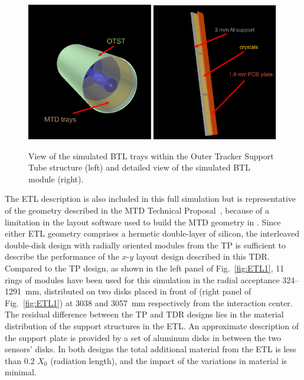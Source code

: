 \begin{figure}[hbtp]
\centering
\includegraphics[width=0.49\textwidth]{fig/performance/BTL1.pdf}
\includegraphics[width=0.49\textwidth]{fig/performance/BTL2.pdf}
\caption{View of the simulated BTL trays within the Outer Tracker Support Tube structure (left) and detailed view of the simulated BTL module (right).}
\label{fig:BTL1}
\end{figure}


The ETL description is also included in this full simulation but is representative of the geometry described in the MTD Technical Proposal~\cite{Collaboration:2296612}, because of a limitation in the layout software used to build the MTD geometry in \GEANT.
Since either ETL geometry comprises a hermetic double-layer of silicon, the interleaved double-disk design with radially oriented modules from the TP is sufficient to describe the performance of the $x$-$y$ layout design described in this TDR.
Compared to the TP design, as shown in the left panel of Fig.~\ref{fig:ETL1}, 11 rings of modules have been used for this simulation in the radial acceptance 324--1291~mm, distributed on two disks placed in front of \HGC (right panel of Fig.~\ref{fig:ETL1}) at 3038 and 3057~mm respectively from the interaction center. 
The residual difference between the TP and TDR designs lies in the material distribution of the support structures in the ETL.
An approximate description of the support plate is provided by a set of aluminum disks in between the two sensors' disks.
In both designs the total additional material from the ETL is less than 0.2 $X_0$ (radiation length), and the impact of the variations in material is minimal. 

